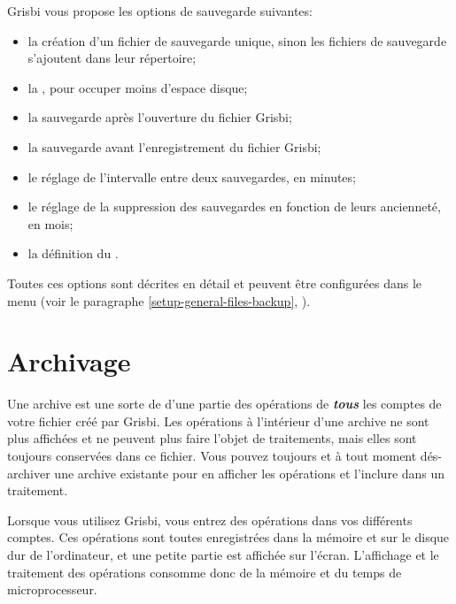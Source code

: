 Grisbi vous propose les options de sauvegarde suivantes:

\begin{itemize}
	\item la création d'un fichier de sauvegarde unique, sinon les fichiers de sauvegarde s'ajoutent dans leur répertoire;
	\item la , pour occuper moins d'espace disque;
	\item la sauvegarde après l'ouverture du fichier Grisbi; 
	\item la sauvegarde avant l'enregistrement du fichier Grisbi; 
	\item le réglage de l'intervalle entre deux sauvegardes, en minutes;
	\item le réglage de la suppression des sauvegardes en fonction de leurs ancienneté, en mois;
	\item la définition du .
\end{itemize}

Toutes ces options sont décrites en détail et peuvent être configurées dans le menu  (voir le paragraphe \vref{setup-general-files-backup}, ).


\section{Archivage\label{datamanagement-archive}}


Une archive est une sorte de  d'une partie des opérations de \textit{\textbf{tous}} les comptes de votre fichier créé par Grisbi. Les opérations à l'intérieur d'une archive ne sont plus affichées et ne peuvent plus faire l'objet de traitements, mais elles sont toujours conservées dans ce fichier. Vous pouvez toujours et à tout moment dés-archiver une archive existante pour en afficher les opérations et l'inclure dans un traitement.

\vspace{.2em}
Lorsque vous utilisez Grisbi, vous entrez des opérations dans vos différents comptes. Ces opérations sont toutes enregistrées dans la mémoire et sur le disque dur de l'ordinateur, et une petite partie est affichée sur l'écran. L'affichage et le traitement des opérations consomme donc de la mémoire et du temps de microprocesseur.


